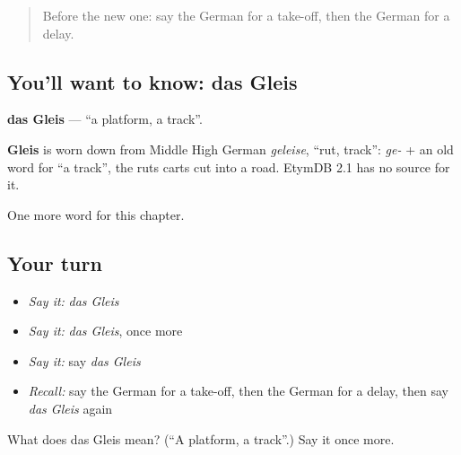 \label{lesson:GE-C192-gleis}



\begin{quote}
Before the new one: say the German for a take-off, then the German for a delay.
\end{quote}

\subsection*{You'll want to know: das Gleis}
\textbf{das Gleis} — \textquotedblleft{}a platform, a track\textquotedblright{}.

\begin{cousinweb}
\textbf{Gleis} is worn down from Middle High German \emph{geleise}, \textquotedblleft{}rut, track\textquotedblright{}: \emph{ge-} + an old word for \textquotedblleft{}a track\textquotedblright{}, the ruts carts cut into a road. EtymDB 2.1 has no source for it.
\end{cousinweb}

\begin{grammarlens}[title={What you've built}]
One more word for this chapter.
\end{grammarlens}

\subsection*{Your turn}
\begin{itemize}
\raggedright
  \item \emph{Say it:} \emph{das Gleis}
  \item \emph{Say it:} \emph{das Gleis}, once more
  \item \emph{Say it:} say \emph{das Gleis}
  \item \emph{Recall:} say the German for a take-off, then the German for a delay, then say \emph{das Gleis} again
\end{itemize}

\begin{tcolorbox}[breakable,colback=teal!4,colframe=teal!35!black,title={Before you move on}]
What does das Gleis mean? (\textquotedblleft{}A platform, a track\textquotedblright{}.) Say it once more.
\end{tcolorbox}
